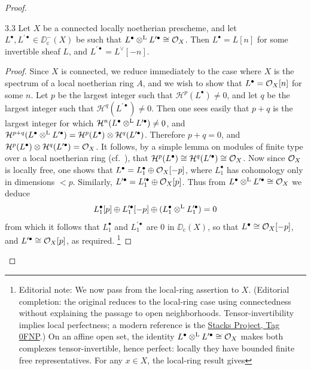 \begin{proof}
\begin{booklemma}{3.3}\label{lem:5.3.3}
Let $X$ be a connected locally noetherian prescheme, and let $L^\bullet,L^{\prime\bullet}\in\DD_{\mathrm{c}}^{-}(X)$ be such that $L^\bullet\mathbin{\otimes^{\mathrm{L}}} L^{\prime\bullet}\cong\mathcal{O}_X$. Then $L^\bullet=L[n]$ for some invertible sheaf $L$, and $L^{\prime\bullet}=L^{\vee}[-n]$.
\end{booklemma}

\begin{proof}
Since $X$ is connected, we reduce immediately to the case where $X$ is the spectrum of a local noetherian ring $A$, and we wish to show that $L^\bullet=\mathcal{O}_X[n]$ for some $n$. Let $p$ be the largest integer such that $\mathcal{H}^p(L^\bullet)\neq0$, and let $q$ be the largest integer such that $\mathcal{H}^q(L^{\prime\bullet})\neq0$. Then one sees easily that $p+q$ is the largest integer for which $\mathcal{H}^n(L^\bullet\mathbin{\otimes^{\mathrm{L}}} L^{\prime\bullet})\neq0$, and $\mathcal{H}^{p+q}(L^\bullet\mathbin{\otimes^{\mathrm{L}}} L^{\prime\bullet})=\mathcal{H}^p(L^\bullet)\otimes \mathcal{H}^q(L^{\prime\bullet})$. Therefore $p+q=0$, and $\mathcal{H}^p(L^\bullet)\otimes \mathcal{H}^q(L^{\prime\bullet})=\mathcal{O}_X$. It follows, by a simple lemma on modules of finite type over a local noetherian ring (cf.\ \cite[,~5.4.3]{EGA}), that $\mathcal{H}^p(L^\bullet)\cong \mathcal{H}^q(L^{\prime\bullet})\cong\mathcal{O}_X$. Now since $\mathcal{O}_X$ is locally free, one shows that $L^\bullet = L_1^\bullet\oplus\mathcal{O}_X[-p]$, where $L_1^\bullet$ has cohomology only in dimensions $<p$. Similarly, $L^{\prime\bullet}=L_1^{\prime\bullet}\oplus\mathcal{O}_X[p]$. Thus from $L^\bullet\mathbin{\otimes^{\mathrm{L}}} L^{\prime\bullet}\cong\mathcal{O}_X$ we deduce
\[
L_{1}^{\bullet}[p]\oplus L_{1}^{\prime\bullet}[-p]\oplus (L_{1}^{\bullet}\mathbin{\otimes^{\mathrm{L}}} L_{1}^{\prime\bullet}) = 0
\]
from which it follows that $L_1^\bullet$ and $L_1^{\prime\bullet}$ are $0$ in $\DD_{\mathrm{c}}(X)$, so that $L^\bullet\cong\mathcal{O}_X[-p]$, and $L^{\prime\bullet}\cong\mathcal{O}_X[p]$, as required.
\footnote{Editorial note: We now pass from the local-ring assertion to $X$. (Editorial completion: the original reduces to the local-ring case using connectedness without explaining the passage to open neighborhoods. Tensor-invertibility implies local perfectness; a modern reference is the \href{https://stacks.math.columbia.edu/tag/0FNP}{Stacks Project, Tag 0FNP}.)
On an affine open set, the identity $L^\bullet\mathbin{\otimes^{\mathrm{L}}} L^{\prime\bullet}\cong\mathcal{O}_X$ makes both complexes tensor-invertible, hence perfect: locally they have bounded finite free representatives. For any $x\in X$, the local-ring result gives
}
\end{proof}
\end{proof}
